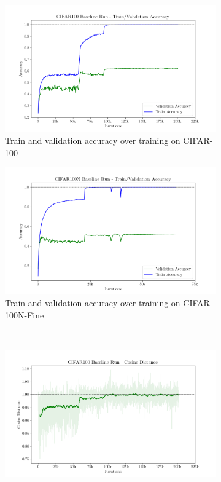\begin{figure}[t!]
  \centering
  \begin{subfigure}{0.495\linewidth}
    \includegraphics[width=\linewidth,  trim=0 0 0 17mm, clip]{figures/figure_1_1_Baseline_Run_CIFAR100.png}
    \caption{Train and validation accuracy over training on CIFAR-100}
    \label{fig:trainingval_cifar100}
  \end{subfigure}
  \hfill
  \begin{subfigure}{0.495\linewidth}
    \includegraphics[width=\linewidth,  trim=0 0 0 17mm, clip]{figures/figure_1_2_Baseline_Run_CIFAR100N.png}
    \caption{Train and validation accuracy over training on CIFAR-100N-Fine}
    \label{fig:trainingval_cifar100n}
  \end{subfigure} \\
  \begin{subfigure}{0.495\linewidth}
    \includegraphics[width=\linewidth,  trim=0 0 0 17mm, clip]{figures/figure_1_3_Baseline_Run_CIFAR100_cosine_distance.png}

\end{subfigure}
\end{figure}
